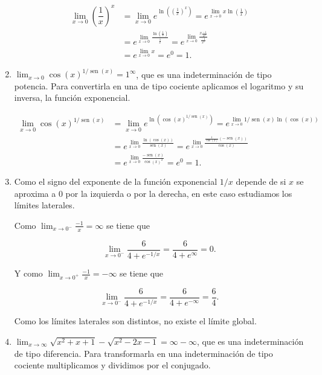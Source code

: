 \documentclass[
  a4paper,
]{scrreport}
\theoremstyle{definition}
\theoremstyle{remark}
\begin{document}
\begin{tcolorbox}
\begin{enumerate}
  \begin{align*}
  \lim_{x\to 0}\left(\dfrac{1}{x}\right)^x 
  &= \lim_{x\to 0}e^{\ln\left(\left(\frac{1}{x}\right)^x\right)}
  = e^{\lim_{x\to 0} x\ln\left(\frac{1}{x}\right)} \\
  &= e^{\lim_{x\to 0} \frac{\ln\left(\frac{1}{x}\right)}{\frac{1}{x}}}
  = e^{\lim_{x\to 0} \frac{x\frac{-1}{x^2}}{\frac{-1}{x^2}}} \tag{L'Hôpital} \\
  &= e^{\lim_{x\to 0} x} 
  = e^0 
  = 1.
  \end{align*}
\item
  \(\lim_{x\to 0}\cos(x)^{1/\operatorname{sen}(x)} = 1^\infty\), que es
  una indeterminación de tipo potencia. Para convertirla en una de tipo
  cociente aplicamos el logaritmo y su inversa, la función exponencial.

  \begin{align*}
  \lim_{x\to 0}\cos (x)^{1/\operatorname{sen}(x)} 
  &= \lim_{x\to 0}e^{\ln\left(\cos(x)^{1/\operatorname{sen}(x)}\right)}  
  =  e^{\lim_{x\to 0}1/\operatorname{sen}(x)\ln(\cos(x))} \\
  &= e^{\lim_{x\to 0}\frac{\ln(\cos(x))}{\operatorname{sen}(x)}}
  = e^{\lim_{x\to 0}\frac{\frac{1}{\cos(x)}(-\operatorname{sen}(x))}{\cos(x)}} \tag{L'Hôpital} \\
  &= e^{\lim_{x\to 0}\frac{-\operatorname{sen}(x)}{\cos(x)^2}}
  = e^0
  = 1.
  \end{align*}
\item
  Como el signo del exponente de la función exponencial \(1/x\) depende
  de si \(x\) se aproxima a \(0\) por la izquierda o por la derecha, en
  este caso estudiamos los límites laterales.

  Como \(\lim_{x\to 0^-}\frac{-1}{x} = \infty\) se tiene que

  \[
  \lim_{x\to 0^-}\frac{6}{4+e^{-1/x}} = \frac{6}{4+e^\infty} = 0.
  \]

  Y como \(\lim_{x\to 0^+}\frac{-1}{x} = -\infty\) se tiene que

  \[
  \lim_{x\to 0^-}\frac{6}{4+e^{-1/x}} = \frac{6}{4+e^{-\infty}} = \frac{6}{4}.
  \]

  Como los límites laterales son distintos, no existe el límite global.
\item
  \(\lim_{x\to \infty} \sqrt{x^2+x+1}-\sqrt{x^2-2x-1} = \infty-\infty\),
  que es una indeterminación de tipo diferencia. Para transformarla en
  una indeterminación de tipo cociente multiplicamos y dividimos por el
  conjugado.


\end{enumerate}
\end{tcolorbox}
\end{document}
